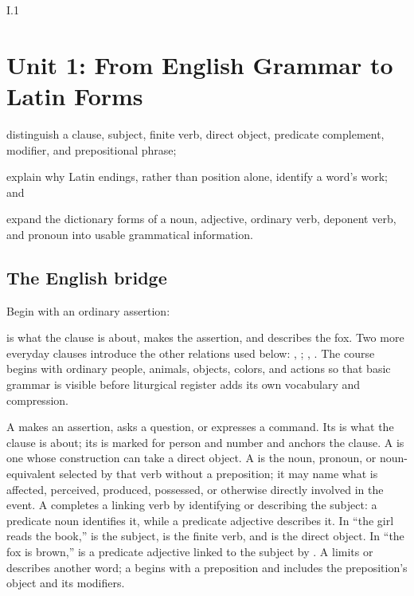 \begin{courseunit}{I.1}
\chapter{Unit 1: From English Grammar to Latin Forms}

\begin{learningobjectives}
  \item distinguish a clause, subject, finite verb, direct object, predicate
        complement, modifier, and prepositional phrase;
  \item explain why Latin endings, rather than position alone, identify a
        word's work; and
  \item expand the dictionary forms of a noun, adjective, ordinary verb,
        deponent verb, and pronoun into usable grammatical information.
\end{learningobjectives}

\section{The English bridge}

Begin with an ordinary assertion:

\begin{quote}
 
\end{quote}

 is what the clause is about,  makes the assertion,
and  describes the fox. Two more everyday clauses introduce the
other relations used below: , ; , . The course begins with ordinary people, animals, objects, colors, and
actions so that basic grammar is visible before liturgical register adds its
own vocabulary and compression.

A  makes an assertion, asks a question, or expresses a command.
Its  is what the clause is about; its  is marked
for person and number and anchors the clause. A  is one
whose construction can take a direct object. A  is the
noun, pronoun, or noun-equivalent selected by that verb without a preposition;
it may name what is affected, perceived, produced, possessed, or otherwise
directly involved in the event.
A  completes a linking verb by identifying or
describing the subject: a predicate noun identifies it, while a predicate
adjective describes it. In ``the girl reads the book,''  is
the subject,  is the finite verb, and  is the
direct object. In ``the fox is brown,''  is a predicate
adjective linked to the subject by . A 
limits or describes another word; a  begins with a
preposition and includes the preposition's object and its modifiers.


\end{courseunit}

